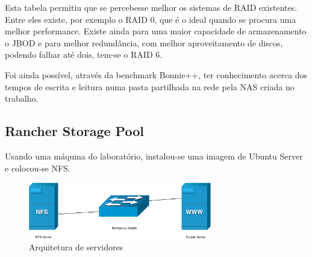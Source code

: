 \documentclass[pdftex,12pt,a4paper]{report}
\begin{document}
\begin{table}[!htb]
\centering
\caption{Resultados finais da benchmark bonnie++}
\label{table:resultados_bonnie}
\end{table}

\newpage

Esta tabela permitiu que se percebesse melhor os sistemas de RAID existentes. Entre eles existe, por exemplo o RAID 0, que é o ideal quando se procura uma melhor performance. Existe ainda para uma maior capacidade de armazenamento o JBOD e para melhor redundância, com melhor aproveitamento de discos, podendo falhar até dois, tem-se o RAID 6.

Foi ainda possível, através da benchmark Bonnie++, ter conhecimento acerca dos tempos de escrita e leitura numa pasta partilhada na rede pela NAS criada no trabalho.


\subsection{Rancher Storage Pool}

Usando uma máquina do laboratório, instalou-se uma imagem de Ubuntu Server e colocou-se NFS.

\begin{figure}[!htb]
\center
 \includegraphics[width=80mm,scale=1]{imagens/servers.pdf}
 \caption{Arquitetura de servidores}
 \label{fig:servers}
\end{figure}
\end{document}
